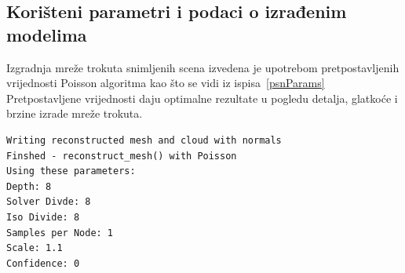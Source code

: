 
\newpage
\subsection{Korišteni parametri i podaci o izrađenim modelima} %
\label{sub:Koristeni parametri i podaci o izradenim modelima}

Izgradnja mreže trokuta snimljenih scena izvedena je upotrebom
pretpostavljenih vrijednosti Poisson algoritma kao što se vidi iz 
ispisa~\ref{psnParams} Pretpostavljene vrijednosti daju optimalne
rezultate u pogledu detalja, glatkoće i brzine izrade mreže trokuta. 

\begin{lstlisting}[label=psnParams,caption={Ispis korištenih paramatera
iz aplikacije \texttt{mesh-reconstruction} }]
Writing reconstructed mesh and cloud with normals
Finshed - reconstruct_mesh() with Poisson
Using these parameters: 
Depth: 8
Solver Divde: 8
Iso Divide: 8
Samples per Node: 1
Scale: 1.1
Confidence: 0
\end{lstlisting}

